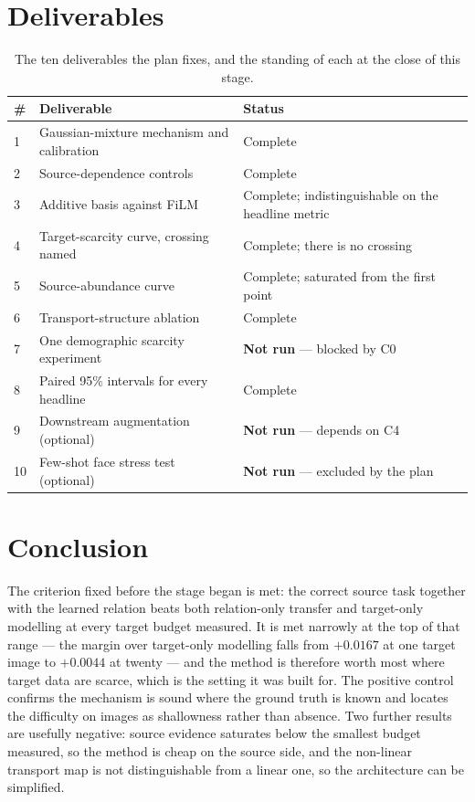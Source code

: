 \documentclass{article}
\begin{document}
\section{Deliverables}

\begin{table}[h]
\centering
\small
\begin{tabular}{llp{6.8cm}}
\toprule
\# & Deliverable & Status\\
\midrule
1 & Gaussian-mixture mechanism and calibration & Complete\\
2 & Source-dependence controls & Complete\\
3 & Additive basis against FiLM & Complete; indistinguishable on the headline metric\\
4 & Target-scarcity curve, crossing named & Complete; there is no crossing\\
5 & Source-abundance curve & Complete; saturated from the first point\\
6 & Transport-structure ablation & Complete\\
7 & One demographic scarcity experiment & \textbf{Not run} --- blocked by C0\\
8 & Paired 95\% intervals for every headline & Complete\\
9 & Downstream augmentation (optional) & \textbf{Not run} --- depends on C4\\
10 & Few-shot face stress test (optional) & \textbf{Not run} --- excluded by the plan\\
\bottomrule
\end{tabular}
\caption{The ten deliverables the plan fixes, and the standing of each at the close of this
stage.}
\end{table}

\section{Conclusion}

The criterion fixed before the stage began is met: the correct source task together with the
learned relation beats both relation-only transfer and target-only modelling at every target
budget measured. It is met narrowly at the top of that range --- the margin over target-only
modelling falls from $+0.0167$ at one target image to $+0.0044$ at twenty --- and the method
is therefore worth most where target data are scarce, which is the setting it was built for.
The positive control confirms the mechanism is sound where the ground
truth is known and locates the difficulty on images as shallowness rather than absence. Two
further results are usefully negative: source evidence saturates below the smallest budget
measured, so the method is cheap on the source side, and the non-linear transport map is not
distinguishable from a linear one, so the architecture can be simplified.
\end{document}
